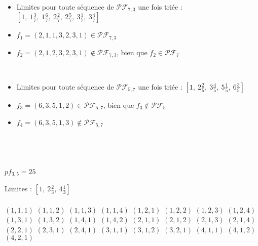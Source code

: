 \begin{example}[Définition 19 : $a > b$ : $a = 7$, $b = 3$]
    ~
    \begin{itemize}
        \item Limites pour toute séquence de $\mathcal{PF}_{7,3}$
            une fois triée : $[1,\ 1 \frac{3}{7},\ 1 \frac{6}{7},\ 
            2 \frac{2}{7},\ 2 \frac{5}{7},\ 3 \frac{1}{7},\ 
            3 \frac{4}{7}]$
        \item $f_1 = (2, 1, 1, 3, 2, 3, 1) \in
            \mathcal{PF}_{7,3}$
        \item $f_2 = (2, 1, 2, 3, 2, 3, 1) \notin
            \mathcal{PF}_{7,3}$, bien que $f_2 \in
            \mathcal{PF}_7$
    \end{itemize}
\end{example}

\begin{example}[Définition 19 : $a < b$ : $a = 5$, $b = 7$]
    ~
    \begin{itemize}
        \item Limites pour toute séquence de $\mathcal{PF}_{5,7}$
            une fois triée : $[1,\ 2 \frac{2}{5},\ 3 \frac{4}{5},\ 
            5 \frac{1}{5},\ 6 \frac{3}{5}]$
        \item $f_3 = (6, 3, 5, 1, 2) \in
            \mathcal{PF}_{5,7}$, bien que $f_3 \notin
            \mathcal{PF}_5$
        \item $f_4 = (6, 3, 5, 1, 3) \notin
            \mathcal{PF}_{5,7}$\\
    \end{itemize}
\end{example}

\begin{example}[Théorème 20 : $a = 3, b = 5$]
    ~\\
    \begin{itemize*}\\
        \item $pf_{3,5} = 25$
        \item Limites : $[1,\ 2 \frac{2}{3},\ 
            4 \frac{1}{3}]$\\\\
        \subitem $(1, 1, 1)$
        \subitem $(1, 1, 2)$
        \subitem $(1, 1, 3)$
        \subitem $(1, 1, 4)$
        \subitem $(1, 2, 1)$
        \subitem $(1, 2, 2)$
        \subitem $(1, 2, 3)$
        \subitem $(1, 2, 4)$
        \subitem $(1, 3, 1)$
        \subitem $(1, 3, 2)$
        \subitem $(1, 4, 1)$
        \subitem $(1, 4, 2)$
        \subitem $(2, 1, 1)$
        \subitem $(2, 1, 2)$
        \subitem $(2, 1, 3)$
        \subitem $(2, 1, 4)$
        \subitem $(2, 2, 1)$
        \subitem $(2, 3, 1)$
        \subitem $(2, 4, 1)$
        \subitem $(3, 1, 1)$
        \subitem $(3, 1, 2)$
        \subitem $(3, 2, 1)$
        \subitem $(4, 1, 1)$
        \subitem $(4, 1, 2)$
        \subitem $(4, 2, 1)$\\
    \end{itemize*}
\end{example}

